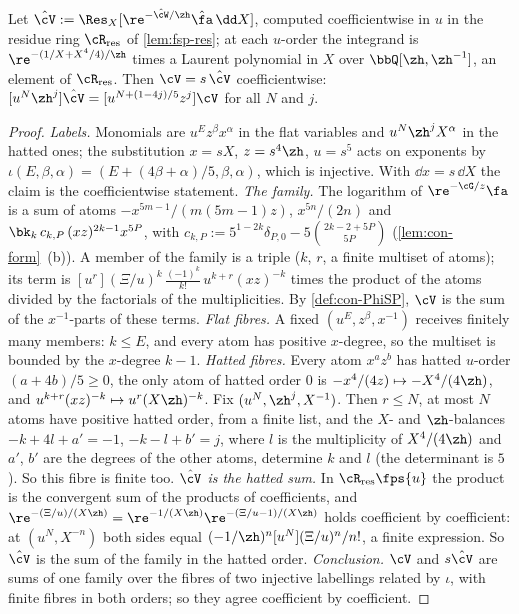 \begin{lem}
\label{lem:con-relab}
Let $\hat\cV:=\Res_X[\re^{-\hat\cW/\zh}\hat\fa\,\dd X]$, computed coefficientwise in $u$ in the residue ring $\cR_{\mathrm{res}}$ of \cref{lem:fsp-res}; at each $u$-order the integrand is $\re^{-(1/X+X^4/4)/\zh}$ times a Laurent polynomial in $X$ over $\bbQ[\zh,\zh^{-1}]$, an element of $\cR_{\mathrm{res}}$. Then $\cV=s\,\hat\cV$ coefficientwise: $[u^N\zh^j]\hat\cV=[u^{N+(1-4j)/5}z^j]\cV$ for all $N$ and $j$.
\end{lem}

\begin{proof}
\emph{Labels.} Monomials are $u^Ez^\beta x^\alpha$ in the flat variables and $u^N\zh^jX^\alpha$ in the hatted ones; the substitution $x=sX$, $z=s^4\zh$, $u=s^5$ acts on exponents by $\iota(E,\beta,\alpha)=(E+(4\beta+\alpha)/5,\beta,\alpha)$, which is injective. With $\dd x=s\,\dd X$ the claim is the coefficientwise statement.
\emph{The family.} The logarithm of $\re^{-\cG/z}\fa$ is a sum of atoms $-x^{5m-1}/(m(5m-1)z)$, $x^{5n}/(2n)$ and $\bk_k\,c_{k,P}\,(xz)^{2k-1}x^{5P}$, with $c_{k,P}:=5^{1-2k}\delta_{P,0}-5\binom{2k-2+5P}{5P}$ (\cref{lem:con-form}~(b)). A member of the family is a triple ($k$, $r$, a finite multiset of atoms); its term is $[u^r](\Xi/u)^k\,\frac{(-1)^k}{k!}\,u^{k+r}(xz)^{-k}$ times the product of the atoms divided by the factorials of the multiplicities. By \cref{def:con-PhiSP}, $\cV$ is the sum of the $x^{-1}$-parts of these terms.
\emph{Flat fibres.} A fixed $(u^E,z^\beta,x^{-1})$ receives finitely many members: $k\leq E$, and every atom has positive $x$-degree, so the multiset is bounded by the $x$-degree $k-1$.
\emph{Hatted fibres.} Every atom $x^az^b$ has hatted $u$-order $(a+4b)/5\geq0$, the only atom of hatted order $0$ is $-x^4/(4z)\mapsto-X^4/(4\zh)$, and $u^{k+r}(xz)^{-k}\mapsto u^r(X\zh)^{-k}$. Fix $(u^N,\zh^j,X^{-1})$. Then $r\leq N$, at most $N$ atoms have positive hatted order, from a finite list, and the $X$- and $\zh$-balances $-k+4l+a'=-1$, $-k-l+b'=j$, where $l$ is the multiplicity of $X^4/(4\zh)$ and $a'$, $b'$ are the degrees of the other atoms, determine $k$ and $l$ (the determinant is $5$). So this fibre is finite too.
\emph{$\hat\cV$ is the hatted sum.} In $\cR_{\mathrm{res}}\fps{u}$ the product is the convergent sum of the products of coefficients, and $\re^{-(\Xi/u)/(X\zh)}=\re^{-1/(X\zh)}\re^{-(\Xi/u-1)/(X\zh)}$ holds coefficient by coefficient: at $(u^N,X^{-n})$ both sides equal $(-1/\zh)^n[u^N](\Xi/u)^n/n!$, a finite expression. So $\hat\cV$ is the sum of the family in the hatted order.
\emph{Conclusion.} $\cV$ and $s\hat\cV$ are sums of one family over the fibres of two injective labellings related by $\iota$, with finite fibres in both orders; so they agree coefficient by coefficient.
\end{proof}


